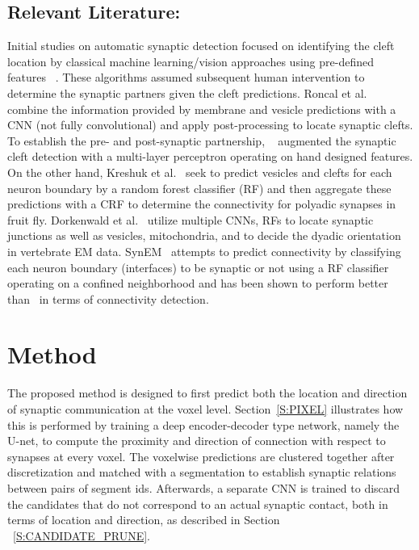 \documentclass{llncs}
\begin{document}
\subsection{Relevant Literature:} Initial studies on automatic synaptic detection focused on identifying the cleft location by classical machine learning/vision approaches using pre-defined features~\cite{kreshuk11plos}\cite{becker13syn}\cite{kreshuk14plos} \cite{plaza14syn}\cite{jagadeesh14}\cite{huang14syn}. These algorithms assumed subsequent human intervention to determine the synaptic partners given the cleft predictions. Roncal et al.~\cite{roncal14vesicle} combine the information provided by membrane and vesicle predictions with a CNN (not fully convolutional) and apply post-processing to locate synaptic clefts.  To establish the pre- and post-synaptic partnership, ~\cite{huang16} augmented the synaptic cleft detection with a multi-layer perceptron operating on hand designed features. On the other hand, Kreshuk et al.~\cite{kreshuk15miccai} seek to predict vesicles and clefts for each neuron boundary by a random forest classifier (RF) and then aggregate these predictions with a CRF to determine the connectivity for polyadic synapses in fruit fly. Dorkenwald et al.~\cite{dorkenwald17syconn} utilize multiple CNNs, RFs to locate synaptic junctions as well as vesicles, mitochondria, and to decide the dyadic orientation in vertebrate EM data. SynEM~\cite{staffler17synem} attempts to predict connectivity by classifying each neuron boundary (interfaces) to be synaptic or not using a RF classifier operating on a confined neighborhood and has been shown to perform better than~\cite{dorkenwald17syconn} in terms of connectivity detection.


\section{Method}
The proposed method is designed to first predict both the location and direction of synaptic communication at the voxel level. Section~\ref{S:PIXEL} illustrates how this is performed by training a deep encoder-decoder type network, namely the U-net, to compute the proximity and direction of connection with respect to synapses at every voxel. The voxelwise predictions are clustered together after discretization and matched with a segmentation to establish synaptic relations between pairs of segment ids. Afterwards, a separate CNN is trained to discard the candidates that do not correspond to an actual synaptic contact, both in terms of location and direction, as described in Section ~\ref{S:CANDIDATE_PRUNE}.
\end{document}
